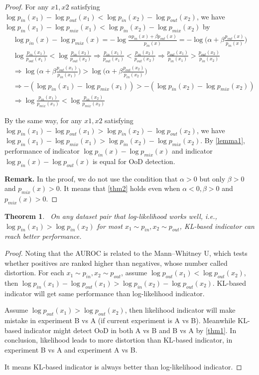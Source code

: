 \documentclass[a3paper]{article}
\newtheorem{theorem}{Theorem}
\newtheorem*{proof}{\it{Proof.}\rm}
\newcommand{\IE}{\textit{i.e.}, }
\newcommand{\pin}{p_{in}}
\newcommand{\pout}{p_{out}}
\newcommand{\pmix}{p_{mix}}
\begin{document}
\begin{proof}\rm
	For any $x1,x2$ satisfying $\log \pin(x_1) - \log \pout(x_1) < \log \pin(x_2) - \log \pout(x_2)$, we have $\log \pin(x_1) - \log \pmix(x_1) < \log \pin(x_2) - \log \pmix(x_2)$ by
	\begin{align*}
		&\log \pin(x) - \log \pmix(x) = -\log \frac{\alpha \pin(x) + \beta \pout(x)}{\pin(x)} = -\log 
		\Big(\alpha + \beta \frac{\pout(x)}{\pin(x)}\Big) \\
		&\log \frac{\pin(x_1)}{\pout(x_1)} < \log \frac{\pin(x_2)}{\pout(x_2)} \Rightarrow \frac{\pin(x_1)}{\pout(x_1)} < \frac{\pin(x_2)}{\pout(x_2)} \Rightarrow \frac{\pout(x_1)}{\pin(x_1)} > \frac{\pout(x_2)}{\pin(x_2)} \\
	 &\Rightarrow \log \Big(\alpha + \beta \frac{\pout(x_1)}{\pin(x_1)}\Big) > \log 
		\Big(\alpha + \beta \frac{\pout(x_2)}{\pin(x_2)}\Big) \\
		&\Rightarrow -(\log \pin(x_1) - \log \pmix(x_1)) > -(\log \pin(x_2) - \log \pmix(x_2)) \\
		&\Rightarrow \log \frac{\pin(x_1)}{\pmix(x_1)} < \log \frac{\pin(x_2)}{\pmix(x_2)} 
	\end{align*}
	
	By the same way, for any $x1,x2$ satisfying $\log \pin(x_1) - \log \pout(x_1) > \log \pin(x_2) - \log \pout(x_2)$, we have $\log \pin(x_1) - \log \pmix(x_1) > \log \pin(x_2) - \log \pmix(x_2)$.  By \cref{lemma1}, performance of indicator $\log \pin(x) - \log \pmix(x)$ and indicator $\log \pin(x) - \log \pout(x)$ is equal for OoD detection.
	
	\noindent \textbf{Remark.} In the proof, we do not use the condition that $\alpha > 0$ but only $\beta > 0$ and $\pmix(x) > 0$. It means that \cref{thm2} holds even when $\alpha < 0, \beta > 0$ and $\pmix(x) > 0$. 
\end{proof}


\begin{theorem}~\label{thm3}On any dataset pair that log-likelihood works well, \IE $\log \pin(x_1) > \log \pin(x_2)$ for most $x_1 \sim \pin, x_2 \sim \pout$, KL-based indicator can reach better performance.
\end{theorem}

\begin{proof}\rm
	Noting that the AUROC is related to the Mann–Whitney U, which tests whether positives are ranked higher than negatives, whose number called distortion. 
	For each $x_1 \sim \pin, x_2 \sim \pout$,
	assume $\log \pout(x_1) < \log \pout(x_2)$, then $\log \pin(x_1) - \log \pout(x_1) > \log \pin(x_2) - \log \pout(x_2)$. 
	KL-based indicator will get same performance than log-likelihood indicator. 
	
	Assume $\log \pout(x_1) > \log \pout(x_2)$, then likelihood indicator will make mistake in experiment B vs A (if current experiment is A vs B). Meanwhile KL-based indicator might detect OoD in both A vs B and B vs A by \cref{thm1}. In conclusion, likelihood leads to more distortion than KL-based indicator, in experiment B vs A and experiment A vs B.
	
	It means KL-based indicator is always better than log-likelihood indicator. 
\end{proof}
\end{document}
